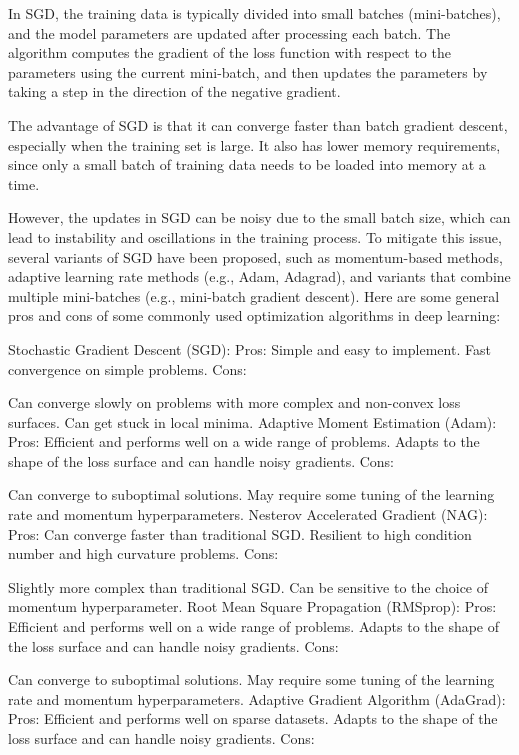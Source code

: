 In SGD, the training data is typically divided into small batches (mini-batches), and the model parameters are updated after processing each batch. The algorithm computes the gradient of the loss function with respect to the parameters using the current mini-batch, and then updates the parameters by taking a step in the direction of the negative gradient.

The advantage of SGD is that it can converge faster than batch gradient descent, especially when the training set is large. It also has lower memory requirements, since only a small batch of training data needs to be loaded into memory at a time.

However, the updates in SGD can be noisy due to the small batch size, which can lead to instability and oscillations in the training process. To mitigate this issue, several variants of SGD have been proposed, such as momentum-based methods, adaptive learning rate methods (e.g., Adam, Adagrad), and variants that combine multiple mini-batches (e.g., mini-batch gradient descent).
Here are some general pros and cons of some commonly used optimization algorithms in deep learning:

Stochastic Gradient Descent (SGD):
Pros:
Simple and easy to implement.
Fast convergence on simple problems.
Cons:

Can converge slowly on problems with more complex and non-convex loss surfaces.
Can get stuck in local minima.
Adaptive Moment Estimation (Adam):
Pros:
Efficient and performs well on a wide range of problems.
Adapts to the shape of the loss surface and can handle noisy gradients.
Cons:

Can converge to suboptimal solutions.
May require some tuning of the learning rate and momentum hyperparameters.
Nesterov Accelerated Gradient (NAG):
Pros:
Can converge faster than traditional SGD.
Resilient to high condition number and high curvature problems.
Cons:

Slightly more complex than traditional SGD.
Can be sensitive to the choice of momentum hyperparameter.
Root Mean Square Propagation (RMSprop):
Pros:
Efficient and performs well on a wide range of problems.
Adapts to the shape of the loss surface and can handle noisy gradients.
Cons:

Can converge to suboptimal solutions.
May require some tuning of the learning rate and momentum hyperparameters.
Adaptive Gradient Algorithm (AdaGrad):
Pros:
Efficient and performs well on sparse datasets.
Adapts to the shape of the loss surface and can handle noisy gradients.
Cons:

